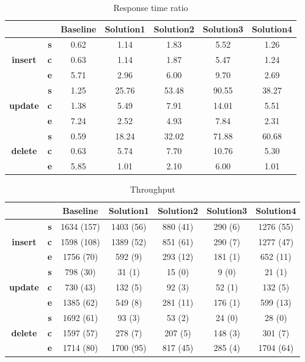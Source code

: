 \begin{table}[h]
\newcommand{\B}[1]{\colorbox{light-gray}{#1}}
 \centering
\caption{Response time ratio}\label{t:}
\begin{tabular}{ccccccc}
\toprule
&&\textbf{Baseline} & \textbf{Solution1} & \textbf{Solution2} & \textbf{Solution3} & \textbf{Solution4}\\
\midrule
\multirow{3}{*}{\textbf{insert}} & \textbf{s} & 0.62 & 1.14 & 1.83 & 5.52 & 1.26\\
 & \textbf{c} & 0.63 & 1.14 & 1.87 & 5.47 & 1.24\\
 & \textbf{e} & 5.71 & 2.96 & 6.00 & 9.70 & 2.69\\
\midrule
\multirow{3}{*}{\textbf{update}} & \textbf{s} & 1.25 & 25.76 & 53.48 & 90.55 & 38.27\\
 & \textbf{c} & 1.38 & 5.49 & 7.91 & 14.01 & 5.51\\
 & \textbf{e} & 7.24 & 2.52 & 4.93 & 7.84 & 2.31\\
\midrule
\multirow{3}{*}{\textbf{delete}} & \textbf{s} & 0.59 & 18.24 & 32.02 & 71.88 & 60.68\\
 & \textbf{c} & 0.63 & 5.74 & 7.70 & 10.76 & 5.30\\
 & \textbf{e} & 5.85 & 1.01 & 2.10 & 6.00 & 1.01\\
\bottomrule
\end{tabular}
\end{table}






\begin{table}[h]
\newcommand{\B}[1]{\colorbox{light-gray}{#1}}
 \centering
\caption{Throughput}\label{t:}
\begin{tabular}{ccccccc}
\toprule
&&\textbf{Baseline} & \textbf{Solution1} & \textbf{Solution2} & \textbf{Solution3} & \textbf{Solution4}\\
\midrule
\multirow{3}{*}{\textbf{insert}} & \textbf{s} & 1634 (157) & 1403 (56) & 880 (41) & 290 (6) & 1276 (55)\\
 & \textbf{c} & 1598 (108) & 1389 (52) & 851 (61) & 290 (7) & 1277 (47)\\
 & \textbf{e} & 1756 (70) & 592 (9) & 293 (12) & 181 (1) & 652 (11)\\
\midrule
\multirow{3}{*}{\textbf{update}} & \textbf{s} & 798 (30) & 31 (1) & 15 (0) & 9 (0) & 21 (1)\\
 & \textbf{c} & 730 (43) & 132 (5) & 92 (3) & 52 (1) & 132 (5)\\
 & \textbf{e} & 1385 (62) & 549 (8) & 281 (11) & 176 (1) & 599 (13)\\
\midrule
\multirow{3}{*}{\textbf{delete}} & \textbf{s} & 1692 (61) & 93 (3) & 53 (2) & 24 (0) & 28 (0)\\
 & \textbf{c} & 1597 (57) & 278 (7) & 207 (5) & 148 (3) & 301 (7)\\
 & \textbf{e} & 1714 (80) & 1700 (95) & 817 (45) & 285 (4) & 1704 (64)\\
\bottomrule
\end{tabular}
\end{table}




